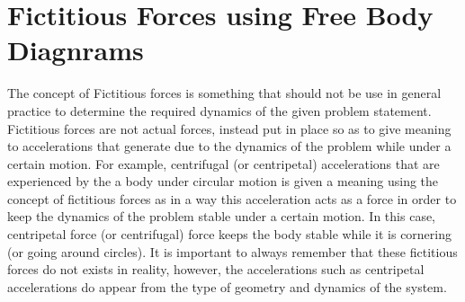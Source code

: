\chapter{Fictitious Forces using Free Body Diagnrams}

The concept of Fictitious forces is something that should not be use in general practice to determine the required dynamics of the given problem statement. Fictitious forces are not actual forces, instead put in place so as to give meaning to accelerations that generate due to the dynamics of the problem while under a certain motion. For example, centrifugal (or centripetal) accelerations that are experienced by the a body under circular motion is given a meaning using the concept of fictitious forces as in a way this acceleration acts as a force in order to keep the dynamics of the problem stable under a certain motion. In this case, centripetal force (or centrifugal) force keeps the body stable while it is cornering (or going around circles). It is important to always remember that these fictitious forces do not exists in reality, however, the accelerations such as centripetal accelerations do appear from the type of geometry and dynamics of the system.

